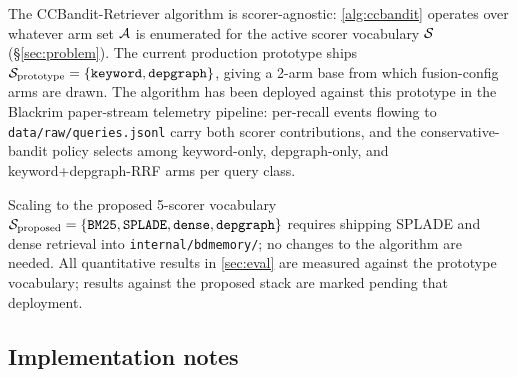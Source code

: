 The CCBandit-Retriever algorithm is scorer-agnostic: \cref{alg:ccbandit}
operates over whatever arm set $\mathcal{A}$ is enumerated for the active scorer
vocabulary $\mathcal{S}$ (\S\ref{sec:problem}).  The current production prototype
ships $\mathcal{S}_{\text{prototype}} = \{\texttt{keyword}, \texttt{depgraph}\}$,
giving a 2-arm base from which fusion-config arms are drawn.  The algorithm has
been deployed against this prototype in the Blackrim paper-stream telemetry
pipeline: per-recall events flowing to
\texttt{data/raw/queries.jsonl} carry both scorer contributions, and the
conservative-bandit policy selects among keyword-only, depgraph-only, and
keyword+depgraph-RRF arms per query class.

Scaling to the proposed 5-scorer vocabulary
$\mathcal{S}_{\text{proposed}} = \{\texttt{BM25}, \texttt{SPLADE}, \texttt{dense},
\texttt{depgraph}\}$ requires shipping SPLADE and dense retrieval into
\texttt{internal/bdmemory/}; no changes to the algorithm are needed.  All
quantitative results in \cref{sec:eval} are measured against the
prototype vocabulary; results against the proposed stack are marked
\tothink{} pending that deployment.

\subsection{Implementation notes}

